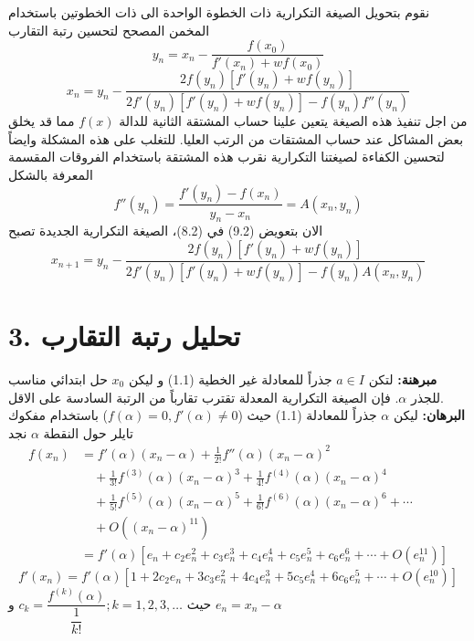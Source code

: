 نقوم بتحويل الصيغة التكرارية ذات الخطوة الواحدة الى ذات الخطوتين باستخدام المخمن المصحح لتحسين رتبة التقارب
\[
y_n = x_n - \frac{f(x_0)}{f'(x_n)+wf(x_0)}
\]
\begin{equation}
x_{n} = y_n - \frac{2f(y_n)[f'(y_n)+wf(y_n)]}{2f'(y_n)[f'(y_n)+wf(y_n)] - f(y_n)f''(y_n)} 
\end{equation}
من اجل تنفيذ هذه الصيغة يتعين علينا حساب المشتقة الثانية للدالة $f(x)$ مما قد يخلق بعض المشاكل عند حساب المشتقات من الرتب العليا. للتغلب على هذه المشكلة وايضاً لتحسين الكفاءة لصيغتنا التكرارية نقرب هذه المشتقة باستخدام الفروقات المقسمة المعرفة بالشكل
\begin{equation}
f''(y_n) = \frac{f'(y_n) - f(x_n)}{y_n - x_n} = A(x_n, y_n)
\end{equation}
الان بتعويض (9.2) في (8.2)، الصيغة التكرارية الجديدة تصبح
\begin{equation}
x_{n+1} = y_n - \frac{2f(y_n)[f'(y_n)+wf(y_n)]}{2f'(y_n) [f'(y_n) + wf(y_n)] -f(y_n)A(x_n, y_n)} 
\end{equation}

\section*{3. تحليل رتبة التقارب}
\textbf{مبرهنة:} لتكن $a\in I$ جذراً للمعادلة غير الخطية (1.1) و ليكن $x_0$ حل ابتدائي مناسب للجذر $\alpha$. فإن الصيغة التكرارية المعدلة تقترب تقارباً من الرتبة السادسة على الاقل.\\
\textbf{البرهان:} ليكن $\alpha$ جذراً للمعادلة (1.1) حيث ($f(\alpha)=0, f'(\alpha)\neq 0$) باستخدام مفكوك تايلر حول النقطة $\alpha$ نجد
\begin{align*}
	f(x_n) &= f'(\alpha)(x_n-\alpha) + \frac{1}{2!} f''(\alpha)(x_n-\alpha)^2\\
	&\quad + \frac{1}{3!} f^{(3)}(\alpha) (x_n-\alpha)^3 + \frac{1}{4!} f^{(4)}(\alpha) (x_n-\alpha)^4\\
	& \quad + \frac{1}{5!} f^{(5)}(\alpha) (x_n-\alpha)^5+ \frac{1}{6!} f^{(6)}(\alpha) (x_n-\alpha)^6 + \cdots\\
	&\quad + O((x_n-\alpha)^{11})\\
	&= f'(\alpha) [e_n + c_2e_n^2 + c_3 e_n^3 + c_4 e_n^4+ c_5 e_n^5+ c_6 e_n^6+\cdots+O(e_n^{11})]
\end{align*}
\[
f'(x_n) = f'(\alpha) [1 + 2c_2e_n + 3c_3 e_n^2 + 4c_4 e_n^3+ 5c_5 e_n^4+ 6c_6 e_n^5+\cdots+O(e_n^{10})]
\]
حيث 
$c_k = \dfrac{f^{(k)}(\alpha)}{\dfrac{1}{k!}}; k=1,2,3,\dots$
و $e_n = x_n-\alpha$